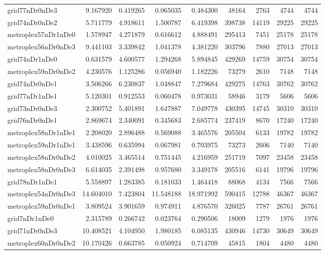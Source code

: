 \begin{longtable}{|l|r|r|r|r|r|r|r|r|}
grid77nDr0nDe3 & 9.167920 & 0.419265 & 0.065035 & 0.484300 & 48164 & 2763 & 4744 & 4744 \\
grid74nDr0nDe2 & 5.711779 & 4.918611 & 1.500787 & 6.419398 & 398738 & 14119 & 29225 & 29225 \\
metroplex57nDr1nDe0 & 1.578947 & 4.271879 & 0.616612 & 4.888491 & 295413 & 7451 & 25178 & 25178 \\
metroplex56nDr0nDe3 & 9.441103 & 3.339842 & 1.041378 & 4.381220 & 303796 & 7880 & 27013 & 27013 \\
grid74nDr1nDe0 & 0.631579 & 4.600577 & 1.294268 & 5.894845 & 429269 & 14759 & 30754 & 30754 \\
metroplex59nDr0nDe2 & 4.230576 & 1.125286 & 0.056940 & 1.182226 & 73279 & 2610 & 7148 & 7148 \\
grid74nDr0nDe1 & 3.506266 & 6.230837 & 1.048847 & 7.279684 & 429275 & 14763 & 30762 & 30762 \\
grid77nDr1nDe1 & 5.120301 & 0.912553 & 0.060478 & 0.973031 & 58946 & 3179 & 5606 & 5606 \\
grid73nDr0nDe3 & 2.300752 & 5.401891 & 1.647887 & 7.049778 & 430395 & 14745 & 30310 & 30310 \\
grid76nDr0nDe1 & 2.869674 & 2.340091 & 0.345683 & 2.685774 & 237419 & 8670 & 17240 & 17240 \\
metroplex58nDr1nDe1 & 2.208020 & 2.896488 & 0.569088 & 3.465576 & 205504 & 6133 & 19782 & 19782 \\
metroplex59nDr1nDe1 & 3.438596 & 0.635994 & 0.067981 & 0.703975 & 73273 & 2606 & 7140 & 7140 \\
metroplex58nDr0nDe2 & 4.010025 & 3.465514 & 0.751445 & 4.216959 & 251719 & 7097 & 23458 & 23458 \\
metroplex58nDr0nDe3 & 6.614035 & 2.391498 & 0.957680 & 3.349178 & 205516 & 6141 & 19796 & 19796 \\
grid78nDr1nDe1 & 5.558897 & 1.283385 & 0.181033 & 1.464418 & 88068 & 4134 & 7566 & 7566 \\
metroplex54nDr0nDe3 & 14.604010 & 7.423804 & 11.548188 & 18.971992 & 590415 & 12788 & 46367 & 46367 \\
metroplex59nDr0nDe1 & 3.809524 & 3.901659 & 0.974911 & 4.876570 & 326025 & 7787 & 26761 & 26761 \\
grid7nDr1nDe0 & 2.315789 & 0.266742 & 0.023764 & 0.290506 & 18009 & 1279 & 1976 & 1976 \\
grid71nDr0nDe3 & 10.408521 & 4.104950 & 1.980185 & 6.085135 & 430946 & 14730 & 30649 & 30649 \\
metroplex60nDr0nDe2 & 10.170426 & 0.663785 & 0.050924 & 0.714709 & 45815 & 1804 & 4480 & 4480 \\

\end{longtable}
